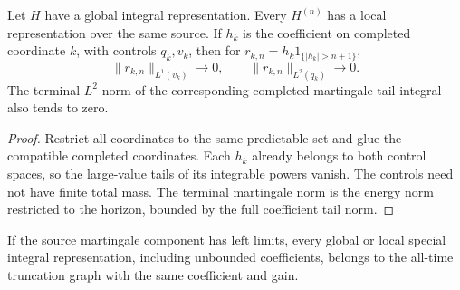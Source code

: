 \begin{proposition}
Let $H$ have a global integral representation. Every $H^{(n)}$ has a local
representation over the same source. If $h_k$ is the coefficient on completed
coordinate $k$, with controls $q_k,v_k$, then for
$r_{k,n}=h_k1_{\{|h_k|>n+1\}}$,
\[
 \|r_{k,n}\|_{L^1(v_k)}\to0,\qquad \|r_{k,n}\|_{L^2(q_k)}\to0.
\]
The terminal $L^2$ norm of the corresponding completed martingale tail
integral also tends to zero.
\end{proposition}
\begin{proof}
Restrict all coordinates to the same predictable set and glue the compatible
completed coordinates. Each $h_k$ already belongs to both control spaces,
so the large-value tails of its integrable powers vanish. The controls need
not have finite total mass. The terminal martingale norm is the energy norm
restricted to the horizon, bounded by the full coefficient tail norm.
\end{proof}
\begin{proposition}
If the source martingale component has left limits, every global or local
special integral representation, including unbounded coefficients, belongs
to the all-time truncation graph with the same coefficient and gain.
\end{proposition}
